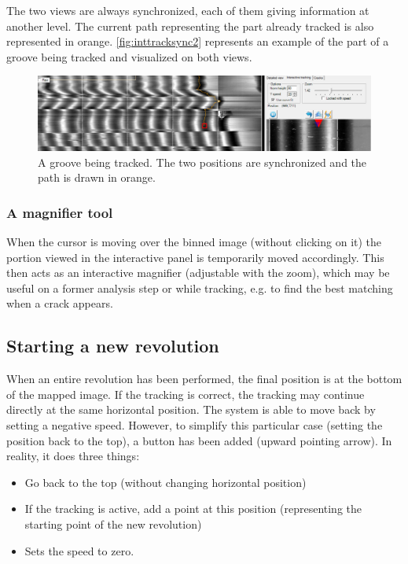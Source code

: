 The two views are always synchronized, each of them giving information at another level. The current path representing the part already tracked is also represented in orange. \autoref{fig:inttracksync2} represents an example of the part of a groove being tracked and visualized on both views.

\begin{figure}[!ht]
\centering
\includegraphics[width=1.0\textwidth]{images/int-track-sync-2}
\caption[A groove being tracked.]
{A groove being tracked. The two positions are synchronized and the path is drawn in orange.}
\label{fig:inttracksync2}
\end{figure}

\subsubsection{A magnifier tool}

When the cursor is moving over the binned image (without clicking on it) the portion viewed in the interactive panel is temporarily moved accordingly. This then acts as an interactive magnifier (adjustable with the zoom), which may be useful on a former analysis step or while tracking, e.g. to find the best matching when a crack appears.

\subsection{Starting a new revolution}

When an entire revolution has been performed, the final position is at the bottom of the mapped image. If the tracking is correct, the tracking may continue directly at the same horizontal position. The system is able to move back by setting a negative speed. However, to simplify this particular case (setting the position back to the top), a button has been added (upward pointing arrow). In reality, it does three things:

\begin{itemize}
\item Go back to the top (without changing horizontal position)
\item If the tracking is active, add a point at this position (representing the starting point of the new revolution)
\item Sets the speed to zero.
\end{itemize}

